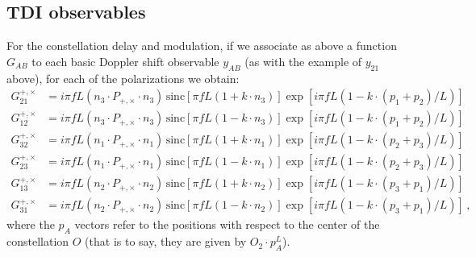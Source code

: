 \documentclass[aps,showpacs,twocolumn,prd,superscriptaddress,nofootinbib]{revtex4}
\newcommand{\nn}{\nonumber}
\newcommand{\sinc}{\,\mathrm{sinc}}
\begin{document}

\subsection{TDI observables}
\label{appsubsec:TDI}

For the constellation delay and modulation, if we associate as above a function $G_{AB}$ to each basic Doppler shift observable $y_{AB}$ (as with the example of $y_{21}$ above), for each of the polarizations we obtain:
%
\begin{align}
	G_{21}^{+,\times} &= i\pi f L \left(n_{3}\cdot P_{+,\times}\cdot n_{3}\right) \sinc\left[ \pi f L \left( 1 + k\cdot n_{3} \right) \right] \exp\left[ i\pi f L \left( 1 - k\cdot (p_{1}+p_{2})/L  \right) \right] \nn\\
	G_{12}^{+,\times} &= i\pi f L \left(n_{3}\cdot P_{+,\times}\cdot n_{3}\right) \sinc\left[ \pi f L \left( 1 - k\cdot n_{3} \right) \right] \exp\left[ i\pi f L \left( 1 - k\cdot (p_{1}+p_{2})/L  \right) \right] \nn\\
	G_{32}^{+,\times} &= i\pi f L \left(n_{1}\cdot P_{+,\times}\cdot n_{1}\right) \sinc\left[ \pi f L \left( 1 + k\cdot n_{1} \right) \right] \exp\left[ i\pi f L \left( 1 - k\cdot (p_{2}+p_{3})/L  \right) \right] \nn\\
	G_{23}^{+,\times} &= i\pi f L \left(n_{1}\cdot P_{+,\times}\cdot n_{1}\right) \sinc\left[ \pi f L \left( 1 - k\cdot n_{1} \right) \right] \exp\left[ i\pi f L \left( 1 - k\cdot (p_{2}+p_{3})/L  \right) \right] \nn\\
	G_{13}^{+,\times} &= i\pi f L \left(n_{2}\cdot P_{+,\times}\cdot n_{2}\right) \sinc\left[ \pi f L \left( 1 + k\cdot n_{2} \right) \right] \exp\left[ i\pi f L \left( 1 - k\cdot (p_{3}+p_{1})/L  \right) \right] \nn\\
	G_{31}^{+,\times} &= i\pi f L \left(n_{2}\cdot P_{+,\times}\cdot n_{2}\right) \sinc\left[ \pi f L \left( 1 - k\cdot n_{2} \right) \right] \exp\left[ i\pi f L \left( 1 - k\cdot (p_{3}+p_{1})/L  \right) \right] \,,
\end{align}
%
where the $p_{A}$ vectors refer to the positions with respect to the center of the constellation $O$ (that is to say, they are given by $O_{2}\cdot p_{A}^{L}$).
\end{document}

